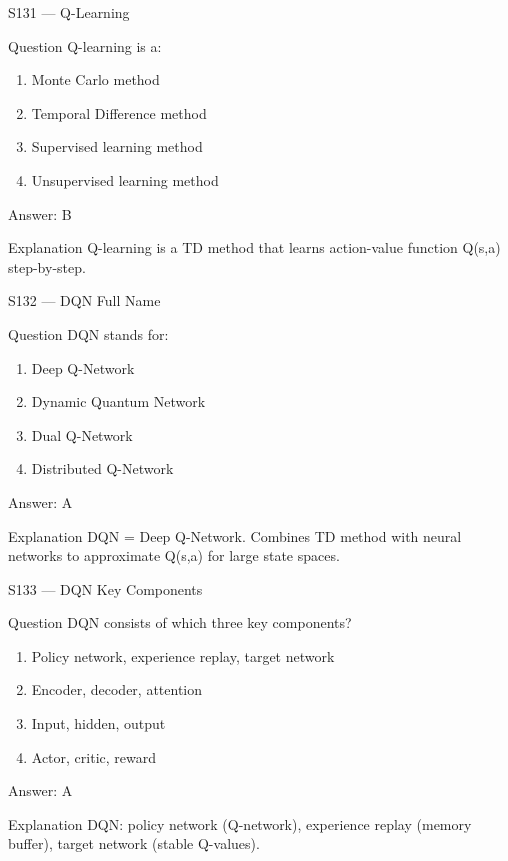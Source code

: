 \documentclass[aspectratio=169,8pt]{beamer}
\begin{document}
	\begin{frame}{S131 --- Q-Learning}
		\begin{block}{Question}
			Q-learning is a:
			\begin{enumerate}
				\item Monte Carlo method
				\item Temporal Difference method
				\item Supervised learning method
				\item Unsupervised learning method
			\end{enumerate}
		\end{block}
		\begin{exampleblock}{Answer: B}\end{exampleblock}
		\begin{block}{Explanation}
			Q-learning is a TD method that learns action-value function Q(s,a) step-by-step.
		\end{block}
	\end{frame}
	
	\begin{frame}{S132 --- DQN Full Name}
		\begin{block}{Question}
			DQN stands for:
			\begin{enumerate}
				\item Deep Q-Network
				\item Dynamic Quantum Network
				\item Dual Q-Network
				\item Distributed Q-Network
			\end{enumerate}
		\end{block}
		\begin{exampleblock}{Answer: A}\end{exampleblock}
		\begin{block}{Explanation}
			DQN = Deep Q-Network. Combines TD method with neural networks to approximate Q(s,a) for large state spaces.
		\end{block}
	\end{frame}
	
	\begin{frame}{S133 --- DQN Key Components}
		\begin{block}{Question}
			DQN consists of which three key components?
			\begin{enumerate}
				\item Policy network, experience replay, target network
				\item Encoder, decoder, attention
				\item Input, hidden, output
				\item Actor, critic, reward
			\end{enumerate}
		\end{block}
		\begin{exampleblock}{Answer: A}\end{exampleblock}
		\begin{block}{Explanation}
			DQN: policy network (Q-network), experience replay (memory buffer), target network (stable Q-values).
		\end{block}
	\end{frame}
	
\end{document}

